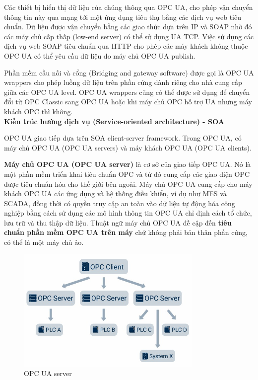 Các thiết bị hiển thị dữ liệu của chúng thông qua OPC UA, cho phép vận chuyển thông tin này qua mạng tới một ứng dụng tiêu thụ bằng các dịch vụ web tiêu chuẩn. Dữ liệu được vận chuyển bằng các giao thức dựa trên IP và SOAP nhờ đó các máy chủ cấp thấp (low-end server) có thể sử dụng UA TCP. Việc sử dụng các dịch vụ web SOAP tiêu chuẩn qua HTTP cho phép các máy khách không thuộc OPC UA có thể yêu cầu dữ liệu do máy chủ OPC UA publish.

Phần mềm cầu nối và cổng (Bridging and gateway software) được gọi là OPC UA wrappers cho phép luồng dữ liệu trên phần cứng dành riêng cho nhà cung cấp giữa các OPC UA level. OPC UA wrappers cũng có thể được sử dụng để chuyển đổi từ OPC Classic sang OPC UA hoặc khi máy chủ OPC hỗ trợ UA nhưng máy khách OPC thì không.\\

\textbf{Kiến trúc hướng dịch vụ (Service-oriented architecture) - SOA}

OPC UA giao tiếp dựa trên SOA client-server framework. Trong OPC UA, có máy chủ OPC UA (OPC UA servers) và máy khách OPC UA (OPC UA clients).

\textbf{Máy chủ OPC UA (OPC UA server)} là cơ sở của giao tiếp OPC UA. Nó là một phần mềm triển khai tiêu chuẩn OPC và từ đó cung cấp các giao diện OPC được tiêu chuẩn hóa cho thế giới bên ngoài. Máy chủ OPC UA cung cấp cho máy khách OPC UA các ứng dụng và hệ thống điều khiển, ví dụ như MES và SCADA, đồng thời có quyền truy cập an toàn vào dữ liệu tự động hóa công nghiệp bằng cách sử dụng các mô hình thông tin OPC UA chỉ định cách tổ chức, lưu trữ và thu thập dữ liệu. Thuật ngữ máy chủ OPC UA đề cập đến \textbf{tiêu chuẩn phần mềm OPC UA trên máy} chứ không phải bản thân phần cứng, có thể là một máy chủ ảo.

\begin{figure}[!h]
    \centering    
    \includegraphics[width=0.8\textwidth]{Images/Basis_knowledge/OPC_server.jpg}
    \caption{OPC UA server \cite{opcrw}}
    \label{fig:comp_mqtt}
\end{figure}

